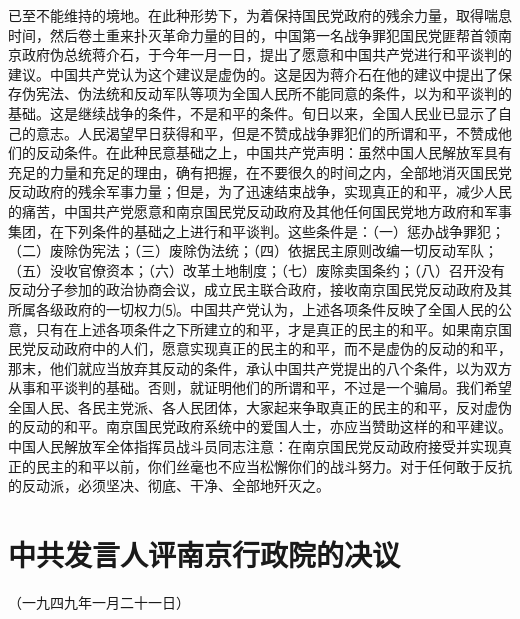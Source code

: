 \documentclass[UTF-8, a5paper, 12pt]{ctexart}
\begin{document}
已至不能维持的境地。在此种形势下，为着保持国民党政府的残余力量，取得喘息时间，然后卷土重来扑灭革命力量的目的，中国第一名战争罪犯国民党匪帮首领南京政府伪总统蒋介石，于今年一月一日，提出了愿意和中国共产党进行和平谈判的建议。中国共产党认为这个建议是虚伪的。这是因为蒋介石在他的建议中提出了保存伪宪法、伪法统和反动军队等项为全国人民所不能同意的条件，以为和平谈判的基础。这是继续战争的条件，不是和平的条件。旬日以来，全国人民业已显示了自己的意志。人民渴望早日获得和平，但是不赞成战争罪犯们的所谓和平，不赞成他们的反动条件。在此种民意基础之上，中国共产党声明：虽然中国人民解放军具有充足的力量和充足的理由，确有把握，在不要很久的时间之内，全部地消灭国民党反动政府的残余军事力量；但是，为了迅速结束战争，实现真正的和平，减少人民的痛苦，中国共产党愿意和南京国民党反动政府及其他任何国民党地方政府和军事集团，在下列条件的基础之上进行和平谈判。这些条件是：（一）惩办战争罪犯；（二）废除伪宪法；（三）废除伪法统；（四）依据民主原则改编一切反动军队；（五）没收官僚资本；（六）改革土地制度；（七）废除卖国条约；（八）召开没有反动分子参加的政治协商会议，成立民主联合政府，接收南京国民党反动政府及其所属各级政府的一切权力⑸。中国共产党认为，上述各项条件反映了全国人民的公意，只有在上述各项条件之下所建立的和平，才是真正的民主的和平。如果南京国民党反动政府中的人们，愿意实现真正的民主的和平，而不是虚伪的反动的和平，那末，他们就应当放弃其反动的条件，承认中国共产党提出的八个条件，以为双方从事和平谈判的基础。否则，就证明他们的所谓和平，不过是一个骗局。我们希望全国人民、各民主党派、各人民团体，大家起来争取真正的民主的和平，反对虚伪的反动的和平。南京国民党政府系统中的爱国人士，亦应当赞助这样的和平建议。中国人民解放军全体指挥员战斗员同志注意：在南京国民党反动政府接受并实现真正的民主的和平以前，你们丝毫也不应当松懈你们的战斗努力。对于任何敢于反抗的反动派，必须坚决、彻底、干净、全部地歼灭之。

\section{中共发言人评南京行政院的决议}

（一九四九年一月二十一日）
\end{document}

